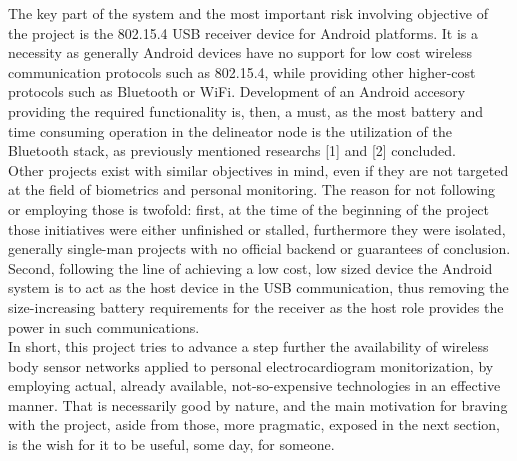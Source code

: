 		The key part of the system and the most important risk involving objective of the project is the 802.15.4 USB receiver device for Android platforms. It is a necessity as generally Android devices have no support for low cost wireless communication protocols such as 802.15.4, while providing other higher-cost protocols such as Bluetooth or WiFi. Development of an Android accesory providing the required functionality is, then, a must, as the most battery and time consuming operation in the delineator node is the utilization of the Bluetooth stack, as previously mentioned researchs [1] and [2] concluded.\\

		Other projects exist with similar objectives in mind, even if they are not targeted at the field of biometrics and personal monitoring. The reason for not following or employing those is twofold: 
		first, at the time of the beginning of the project those initiatives were either unfinished or stalled, furthermore they were isolated, generally single-man projects with no official backend or guarantees of conclusion.
		Second, following the line of achieving a low cost, low sized device the Android system is to act as the host device in the USB communication, thus removing the size-increasing battery requirements for the receiver as the host role provides the power in such communications.\\

		In short, this project tries to advance a step further the availability of wireless body sensor networks applied to personal electrocardiogram monitorization, by employing actual, already available, not-so-expensive technologies in an effective manner. That is necessarily good by nature, and the main motivation for braving with the project, aside from those, more pragmatic, exposed in the next section, is the wish for it to be useful, some day, for someone.

